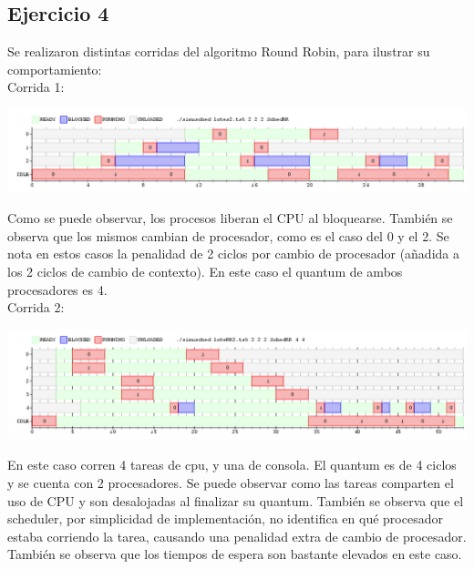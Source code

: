 \subsection{Ejercicio 4}

Se realizaron distintas corridas del algoritmo Round Robin, para ilustrar su comportamiento: \\

\noindent
Corrida 1:


\begin{center}
\includegraphics[scale=0.4]{graficos/rr_lotes2.png}
\end{center}

Como se puede observar, los procesos liberan el CPU al bloquearse. También se observa que los mismos cambian de procesador, como es el caso del 0 y el 2. Se nota en estos casos la penalidad de 2 ciclos por cambio de procesador (añadida a los 2 ciclos de cambio de contexto).  En este caso el quantum de ambos procesadores es 4. \\

\noindent
Corrida 2:


\begin{center}
\includegraphics[scale=0.4]{graficos/rr2.png}
\end{center}

En este caso corren 4 tareas de cpu, y una de consola. El quantum es de 4 ciclos y se cuenta con 2 procesadores. Se puede observar como las tareas comparten el uso de CPU y son desalojadas al finalizar su quantum. También se observa que el scheduler, por simplicidad de implementación, no identifica en qué procesador estaba corriendo la tarea, causando una penalidad extra de cambio de procesador. También se observa que los tiempos de espera son bastante elevados en este caso.

